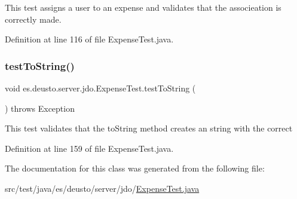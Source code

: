 This test assigns a user to an expense and validates that the associeation is correctly made. 

Definition at line 116 of file Expense\+Test.\+java.

\mbox{\label{classes_1_1deusto_1_1server_1_1jdo_1_1_expense_test_a3ad0e782abaa1880cc5f0b6f3dab2759}} 
\subsubsection{\texorpdfstring{test\+To\+String()}{testToString()}}
{\footnotesize\ttfamily void es.\+deusto.\+server.\+jdo.\+Expense\+Test.\+test\+To\+String (\begin{DoxyParamCaption}{ }\end{DoxyParamCaption}) throws Exception}

This test validates that the to\+String method creates an string with the correct 

Definition at line 159 of file Expense\+Test.\+java.



The documentation for this class was generated from the following file\+:\begin{DoxyCompactItemize}
\item 
src/test/java/es/deusto/server/jdo/\hyperlink{_expense_test_8java}{Expense\+Test.\+java}\end{DoxyCompactItemize}
